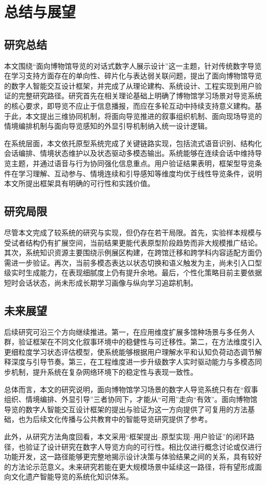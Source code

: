\chapter{总结与展望}

\section{研究总结}
本文围绕“面向博物馆导览的对话式数字人展示设计”这一主题，针对传统数字导览在学习支持方面存在的单向性、碎片化与表达弱关联问题，提出了面向博物馆导览的数字人智能交互设计框架，并完成了从理论建构、系统设计、工程实现到用户验证的完整研究路径。研究首先在相关理论基础上明确了博物馆学习场景对导览系统的核心要求，即导览不应止于信息播报，而应在多轮互动中持续支持意义建构。基于此，本文提出三维协同机制，将面向导览推进的叙事组织机制、面向现场导览的情境编排机制与面向导览感知的外显引导机制纳入统一设计逻辑。

在系统层面，本文依托原型系统完成了关键链路实现，包括流式语音识别、结构化会话编排、情境状态维护以及状态驱动多模态输出。系统能够在连续会话中维持导览主题，并通过语音与行为协同强化信息重点。用户验证结果表明，框架型导览条件在学习理解、互动参与、情境连续和引导感知等维度均优于线性导览条件，说明本文所提出框架具有明确的可行性和实践价值。

\section{研究局限}
尽管本文完成了较系统的研究与实现，但仍存在若干局限。首先，实验样本规模与受试者结构仍有扩展空间，当前结果更能代表原型阶段趋势而非大规模推广结论。其次，系统知识资源主要围绕示例展区构建，在跨馆迁移和跨学科内容适配方面仍需进一步验证。再次，当前多模态表达以状态切换和语义触发为主，尚未引入口型级实时生成能力，在表现细腻度上仍有提升余地。最后，个性化策略目前主要依据短时会话状态，尚未形成长期学习画像与纵向学习追踪机制。

\section{未来展望}
后续研究可沿三个方向继续推进。第一，在应用维度扩展多馆种场景与多任务人群，验证框架在不同文化叙事环境中的稳健性与可迁移性。第二，在方法维度引入更细粒度学习状态评估模型，使系统能够根据用户理解水平和认知负荷动态调节解释深度与引导节奏。第三，在工程维度进一步升级数字人实时驱动能力与多模态同步机制，提升系统在复杂网络环境下的稳定性与表现一致性。

总体而言，本文的研究说明，面向博物馆学习场景的数字人导览系统只有在“叙事组织、情境编排、外显引导”三者协同下，才能从“可用”走向“有效”。面向博物馆导览的数字人智能交互设计框架的提出与验证为这一方向提供了可复用的方法基础，也为后续文化传播与公共教育中的智能导览研究提供了参考。

此外，从研究方法角度回看，本文采用“框架提出--原型实现--用户验证”的闭环路径，也验证了设计研究在数字人导览方向的可行性。相比仅进行概念讨论或仅进行功能开发，这一路径能够更完整地揭示设计决策与体验结果之间的关系，具有较好的方法论示范意义。未来研究若能在更大规模场景中延续这一路径，将有望形成面向文化遗产智能导览的系统化知识体系。
